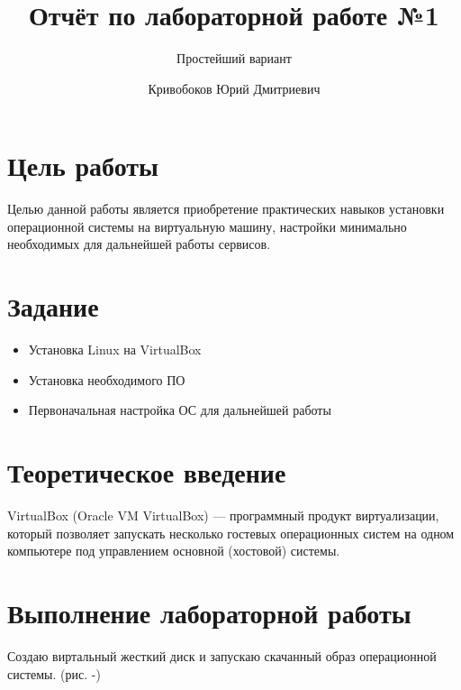 \documentclass[
  12pt,
  a4paper,
  DIV=11,
  numbers=noendperiod]{scrreprt}
\title{Отчёт по лабораторной работе №1}
\subtitle{Простейший вариант}
\author{Кривобоков Юрий Дмитриевич}
\date{}
\providecommand{\tightlist}{%
  \setlength{\itemsep}{0pt}\setlength{\parskip}{0pt}}\usepackage{longtable,booktabs,array}
\renewcommand*\contentsname{Содержание}
\newcommand\contentsname{Содержание}
\begin{document}
\maketitle

\renewcommand*\contentsname{Содержание}
{
\setcounter{tocdepth}{1}
\tableofcontents
}
\listoffigures
\listoftables
{}
\chapter{Цель
работы}\label{ux446ux435ux43bux44c-ux440ux430ux431ux43eux442ux44b}

Целью данной работы является приобретение практических навыков установки
операционной системы на виртуальную машину, настройки минимально
необходимых для дальнейшей работы сервисов.

\chapter{Задание}\label{ux437ux430ux434ux430ux43dux438ux435}

\begin{itemize}
\tightlist
\item
  Установка Linux на VirtualBox
\item
  Установка необходимого ПО
\item
  Первоначальная настройка ОС для дальнейшей работы
\end{itemize}

\chapter{Теоретическое
введение}\label{ux442ux435ux43eux440ux435ux442ux438ux447ux435ux441ux43aux43eux435-ux432ux432ux435ux434ux435ux43dux438ux435}

VirtualBox (Oracle VM VirtualBox) --- программный продукт виртуализации,
который позволяет запускать несколько гостевых операционных систем на
одном компьютере под управлением основной (хостовой) системы.

\chapter{Выполнение лабораторной
работы}\label{ux432ux44bux43fux43eux43bux43dux435ux43dux438ux435-ux43bux430ux431ux43eux440ux430ux442ux43eux440ux43dux43eux439-ux440ux430ux431ux43eux442ux44b}

Создаю виртальный жесткий диск и запускаю скачанный образ операционной
системы. (рис. -\textcite{fig:001})
\end{document}
